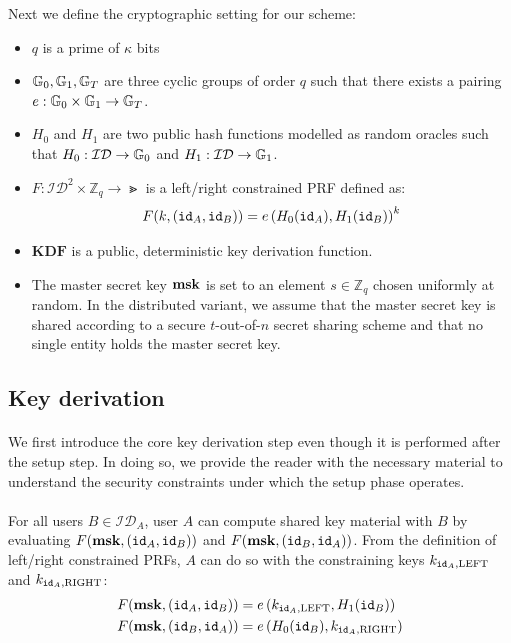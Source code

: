 		\noindent Next we define the cryptographic setting for our scheme:
		\begin{itemize}
			\item $q$ is a prime of $\kappa$ bits
			\item $\mathbb{G}_0, \mathbb{G}_1, \mathbb{G}_T$ are three cyclic groups of order $q$ such that there exists a pairing $e : \mathbb{G}_0 \times \mathbb{G}_1 \rightarrow \mathbb{G}_T$.
			\item $H_0$ and $H_1$ are two public hash functions modelled as random oracles such that $H_0: \mathcal{ID}\rightarrow \mathbb{G}_0$ and $H_1: \mathcal{ID} \rightarrow \mathbb{G}_1$.
			\item $F: \mathcal{ID}^2 \times \mathbb{Z}_q \rightarrow \Gt$ is a left/right constrained PRF defined as: \begin{equation}
				F(k, (\mathtt{id}_A, \mathtt{id}_B)) = e\left(H_0(\mathtt{id}_A), H_1(\mathtt{id}_B) \right)^k
			\end{equation}
			\item $\mathbf{KDF}$ is a public, deterministic key derivation function.
			\item The master secret key $\mathbf{msk}$ is set to an element $s \in \mathbb{Z}_q$ chosen uniformly at random. In the distributed variant, we assume that the master secret key is shared according to a secure $t$-out-of-$n$ secret sharing scheme and that no single entity holds the master secret key.
		\end{itemize}

	\subsection{Key derivation}
	
		\paragraph{} We first introduce the core key derivation step even though it is performed after the setup step. In doing so, we provide the reader with the necessary material to understand the security constraints under which the setup phase operates.
		
		\paragraph{} For all users $B \in \mathcal{ID}_A$, user $A$ can compute shared key material with $B$ by evaluating $F(\mathbf{msk}, (\mathtt{id}_A, \mathtt{id}_B))$ and $F(\mathbf{msk}, (\mathtt{id}_B, \mathtt{id}_A))$. From the definition of left/right constrained PRFs, $A$ can do so with the constraining keys $k_{\mathtt{id}_A,\mathrm{LEFT}}$ and $k_{\mathtt{id}_A,\mathrm{RIGHT}}$:
		\begin{align}
			F(\mathbf{msk}, (\mathtt{id}_A, \mathtt{id}_B)) &= e\left(k_{\mathtt{id}_A,\mathrm{LEFT}}, H_1(\mathtt{id}_B) \right) \\
			F(\mathbf{msk}, (\mathtt{id}_B, \mathtt{id}_A)) &= e\left(H_0(\mathtt{id}_B), k_{\mathtt{id}_A,\mathrm{RIGHT}} \right)
		\end{align} 
	

